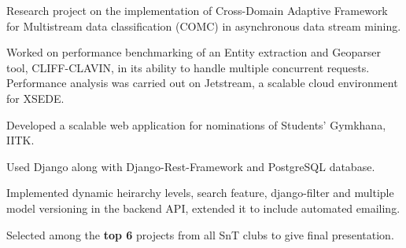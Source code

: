 \documentclass[]{deedy-resume-openfont}
\begin{document}
\begin{minipage}[t]{0.70\textwidth}

\vspace{0.1cm}
\vspace{0cm} %
\begin{tightemize}
  \item Research project on the implementation of Cross-Domain Adaptive Framework for Multistream data classification (COMC) in asynchronous data stream mining.
  \item Worked on performance benchmarking of an Entity extraction and Geoparser tool, CLIFF-CLAVIN, in its ability to handle multiple concurrent requests. Performance analysis was carried out on Jetstream, a scalable cloud environment for XSEDE.
\end{tightemize}

\vspace{0.1cm}
\vspace{0cm} %
\begin{tightemize}
  \item Developed a scalable web application for nominations of Students' Gymkhana, IITK.
  \item Used Django along with Django-Rest-Framework and PostgreSQL database.
  \item	Implemented dynamic heirarchy levels, search feature, django-filter and multiple model versioning in the backend API, extended it to include automated emailing.
  \item	Selected among the \textbf{top 6} projects from all SnT clubs to give final presentation.
\end{tightemize}


\end{minipage}
\end{document}
